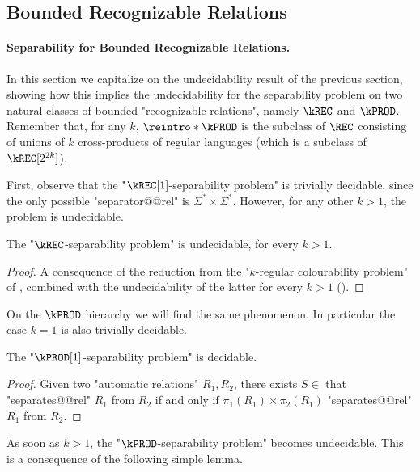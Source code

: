 \subsection{Bounded Recognizable Relations}

\paragraph*{Separability for Bounded Recognizable Relations.}

In this section we capitalize on the undecidability result of the previous section, showing how this implies the undecidability for the separability problem on two natural classes of bounded "recognizable relations", namely $\kREC$ and $\kPROD$.
Remember that, for any $k$, $\reintro*\kPROD$ is the subclass of $\REC$ consisting of unions of $k$ cross-products of regular languages (which is a subclass of $\kREC[2^{2k}]$).

First, observe that the "$\kREC[1]$-separability problem" is trivially decidable, since the only possible "separator@@rel" is $\Sigma^* \times \Sigma^*$. However, for any other $k>1$, the problem is undecidable.

\begin{proposition}
    The "$\kREC$-separability problem" is undecidable, for every $k>1$.
\end{proposition}
\begin{proof}
A consequence of the reduction from the "$k$-regular colourability problem" of , combined with the undecidability of the latter for every $k>1$ ().
\end{proof}

On the $\kPROD$ hierarchy we will find the same phenomenon. In particular the case $k=1$ is also trivially decidable.

\begin{proposition}
    The "$\kPROD[1]$-separability problem" is decidable.
\end{proposition}
\begin{proof}
    Given two "automatic relations" $R_1, R_2$, there exists $S \in $ \kPROD[1]
    that "separates@@rel" $R_1$ from $R_2$ if and only if $\pi_1(R_1)\times \pi_2(R_1)$
    "separates@@rel" $R_1$ from $R_2$.
\end{proof}

As soon as $k>1$, the "$\kPROD$-separability problem" becomes undecidable. This is a consequence of the following simple lemma.

